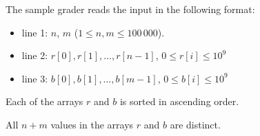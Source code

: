 The sample grader reads the input in the following format:
\begin{itemize}
\item line 1: $n$, $m$ ($1 \le n, m \le 100\,000$).
\item line 2: $r[0], r[1], \ldots, r[n - 1]$, $0 \le r[i] \le 10^9$
\item line 3: $b[0], b[1], \ldots, b[m - 1]$, $0 \le b[i] \le 10^9$
\end{itemize}

Each of the arrays $r$ and $b$ is sorted in ascending order.

All $n + m$ values in the arrays $r$ and $b$ are distinct.